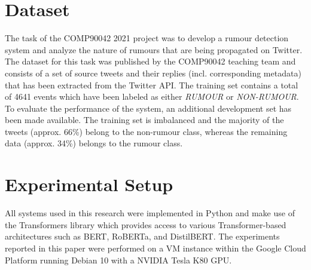 \documentclass[11pt,a4paper]{article}
\begin{document}
\section{Dataset}
The task of the COMP90042 2021 project was to develop a rumour detection system and analyze the nature of rumours that are being propagated on Twitter.
The dataset for this task was published by the COMP90042 teaching team and consists of a set of source tweets and their replies (incl. corresponding metadata) that has been extracted from the Twitter API.
The training set contains a total of 4641 events which have been labeled as either \textit{RUMOUR} or \textit{NON-RUMOUR}. To evaluate the performance of the system, an additional development set has been made available.
\newline
The training set is imbalanced and the majority of the tweets (approx. 66\%) belong to the non-rumour class, whereas the remaining data (approx. 34\%) belongs to the rumour class.



\section{Experimental Setup}
All systems used in this research were implemented in Python and make use of the Transformers library \citep{RN682} which provides access to various Transformer-based architectures such as BERT, RoBERTa, and DistilBERT. 
\newline
The experiments reported in this paper were performed on a VM instance within the Google Cloud Platform running Debian 10 with a NVIDIA Tesla K80 GPU.
\end{document}

